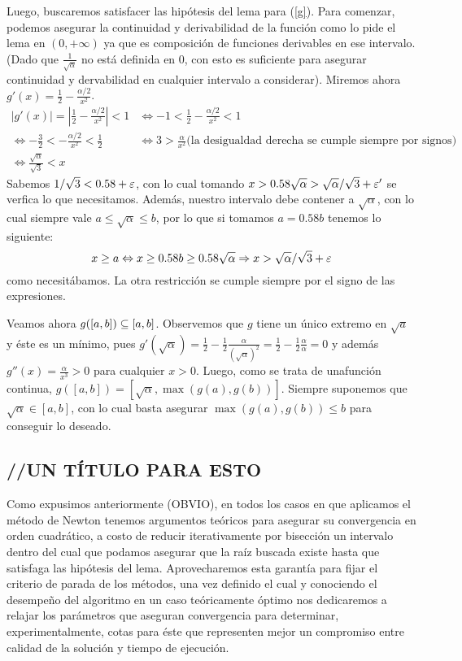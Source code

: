 Luego, buscaremos satisfacer las hipótesis del lema para (\ref{g}). Para comenzar, podemos asegurar la continuidad y derivabilidad de la función como lo pide el lema en $(0, +\infty)$ ya que es composición de funciones derivables en ese intervalo. (Dado que $\frac{1}{\sqrt{\alpha}}$ no está definida en 0, con esto es suficiente para asegurar continuidad y dervabilidad en cualquier intervalo a considerar). Miremos ahora $ g'(x) = \frac{1}{2} - \frac{\alpha/2}{x^2}$.\\
$\begin{array}{rl}
	 |g'(x)| = |\frac{1}{2} - \frac{\alpha/2}{x^2}|  < 1 & \Leftrightarrow  -1 < \frac{1}{2} - \frac{\alpha/2}{x^2} < 1\nonumber \\
	\Leftrightarrow  -\frac{3}{2} <  - \frac{\alpha/2}{x^2}  < \frac{1}{2} & \Leftrightarrow 
		3 >  \frac{\alpha}{x^2}  \text{(la desigualdad derecha se cumple siempre por signos)} \nonumber \\
	\Leftrightarrow  \frac{\sqrt{\alpha}}{\sqrt{3}} < x \nonumber
\end{array}$\\
Sabemos $1/\sqrt{3} < 0.58 + \varepsilon$, con lo cual tomando $x > 0.58\sqrt{\alpha} > \sqrt{\alpha}/\sqrt{3} + \varepsilon'$ se verfica lo que necesitamos. Además, nuestro intervalo debe contener a $\sqrt{\alpha}$, con lo cual siempre vale $a \leq \sqrt{\alpha} \leq b$, por lo que si tomamos $a = 0.58b$ tenemos lo siguiente:
$$x \geq a \Leftrightarrow x \geq 0.58b \geq 0.58\sqrt{\alpha} \Rightarrow x > \sqrt{\alpha}/\sqrt{3} + \varepsilon$$ 
como necesitábamos. La otra restricción se cumple siempre por el signo de las expresiones.

Veamos ahora $g([a,b]) \subseteq [a,b]$. Observemos que $g$ tiene un único extremo en $\sqrt{a}$ y éste es un mínimo, pues $g'(\sqrt{\alpha}) = \frac{1}{2} - \frac{1}{2}\frac{\alpha}{(\sqrt{\alpha})^2} = \frac{1}{2} - \frac{1}{2}\frac{\alpha}{\alpha} = 0$ y además $g''(x) = \frac{\alpha}{x^3} >0$ para cualquier $x>0$. Luego, como se trata de unafunción continua, $g([a,b]) = [\sqrt{\alpha}, \max(g(a), g(b))]$. Siempre suponemos que $\sqrt{\alpha}\in[a,b]$, con lo cual basta asegurar $\max(g(a), g(b))\leq b$ para conseguir lo deseado.

	\subsection{//UN TÍTULO PARA ESTO}
	
Como expusimos anteriormente (OBVIO), en todos los casos en que aplicamos el método de Newton tenemos argumentos teóricos para asegurar su convergencia en orden cuadrático, a costo de reducir iterativamente por bisección un intervalo dentro del cual que podamos asegurar que la raíz buscada existe hasta que satisfaga las hipótesis del lema. Aprovecharemos esta garantía para fijar el criterio de parada de los métodos, una vez definido el cual y conociendo el desempeño del algoritmo en un caso teóricamente óptimo nos dedicaremos a relajar los parámetros que aseguran convergencia para determinar, experimentalmente, cotas para éste que representen mejor un compromiso entre calidad de la solución y tiempo de ejecución.

